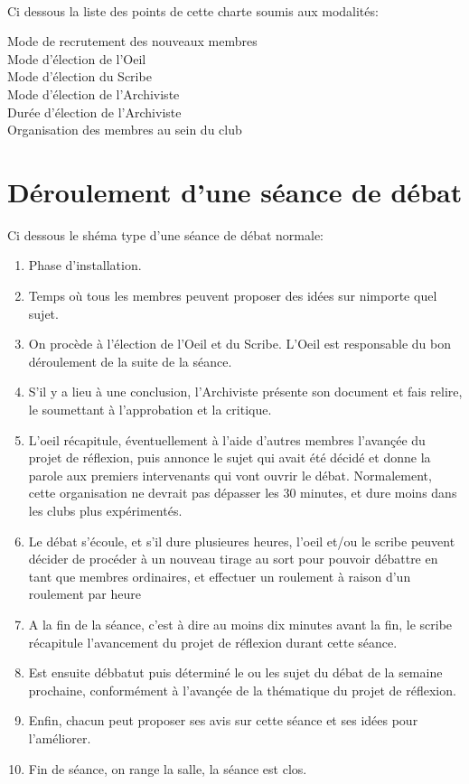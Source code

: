 \documentclass[a4paper,12pt]{article}
\begin{document}
\paragraph{}
Ci dessous la liste des points de cette charte soumis aux modalités:
\begin{description}
 \item [Mode de recrutement des nouveaux membres]
 \item [Mode d'élection de l'Oeil]
 \item [Mode d'élection du Scribe]
 \item [Mode d'élection de l'Archiviste]
 \item [Durée d'élection de l'Archiviste]
 \item [Organisation des membres au sein du club]
\end{description}

\section{Déroulement d'une séance de débat}
Ci dessous le shéma type d'une séance de débat normale:
\begin{enumerate}
 \item Phase d'installation.
 \item Temps où tous les membres peuvent proposer des idées sur nimporte quel sujet.
 \item On procède à l'élection de l'Oeil et du Scribe. L'Oeil est responsable du bon déroulement de la suite de la séance.
 \item S'il y a lieu à une conclusion, l'Archiviste présente son document et fais relire, le soumettant à l'approbation et la critique.
 \item L'oeil récapitule, éventuellement à l'aide d'autres membres l'avançée du projet de réflexion, puis annonce le sujet qui avait été décidé et donne la parole aux premiers intervenants qui vont ouvrir le débat.
 Normalement, cette organisation ne devrait pas dépasser les 30 minutes, et dure moins dans les clubs plus expérimentés.
 \item Le débat s'écoule, et s'il dure plusieures heures, l'oeil et/ou le scribe peuvent décider de procéder à un nouveau tirage au sort pour pouvoir débattre en tant que membres ordinaires, et effectuer un roulement à raison d'un roulement par heure
 \item A la fin de la séance, c'est à dire au moins dix minutes avant la fin, le scribe récapitule l'avancement du projet de réflexion durant cette séance. 
 \item Est ensuite débbatut puis déterminé le ou les sujet du débat de la semaine prochaine, conformément à l'avançée de la thématique du projet de réflexion.
 \item Enfin, chacun peut proposer ses avis sur cette séance et ses idées pour l'améliorer.
 \item Fin de séance, on range la salle, la séance est clos.
\end{enumerate}
\end{document}
